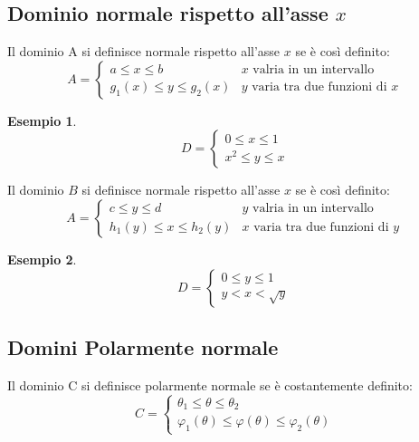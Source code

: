 \documentclass{book}
\newtheorem{esempio}{Esempio}
\begin{document}
\subsection{Dominio normale rispetto all'asse $x$}
Il dominio A si definisce {\color{red} normale} rispetto all'asse $x$ se è così
definito:
\begin{equation}
	A=\begin{cases}
		a\leq x\leq b & x \text{ valria in un intervallo}\\
		g_1(x)\leq y\leq g_2(x) & y \text{ varia tra due funzioni di }x
	\end{cases}
\end{equation}
\begin{esempio}
\begin{equation*}
	D=\begin{cases}
		0\leq x\leq 1\\
		x^2\leq y\leq x
	\end{cases}
\end{equation*}
\end{esempio}
Il dominio $B$ si definisce {\color{red} normale} rispetto all'asse $x$ se è così
definito:
\begin{equation}
	A=\begin{cases}
		c\leq y\leq d & y \text{ valria in un intervallo}\\
		h_1(y)\leq x\leq h_2(y) & x \text{ varia tra due funzioni di }y
	\end{cases}
\end{equation}
\begin{esempio}
\begin{equation*}
	D=\begin{cases}
		0\leq y\leq 1\\
		y< x< \sqrt{y}
	\end{cases}
\end{equation*}
\end{esempio}
\subsection{Domini Polarmente normale}
Il dominio C si definisce polarmente normale se è costantemente definito:
\begin{equation}
	C=\begin{cases}
		\theta_1\leq \theta\leq \theta_2 \\
		\varphi_1(\theta)\leq \varphi(\theta)\leq \varphi_2(\theta)
	\end{cases}
\end{equation}

\printindex
\end{document}
